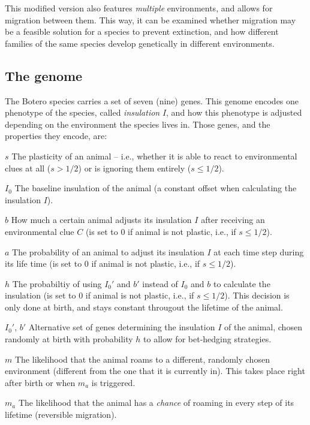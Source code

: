 \documentclass[
12pt, %
a4paper, %
headinclude,footinclude %
]{article}
\newcommand{\modfont}[1]{\begingroup\color{red}#1\endgroup}
\begin{document}
\modfont{This modified version also features \emph{multiple} environments, and allows for migration between them. This way, it can be examined whether migration may be a feasible solution for a species to prevent extinction, and how different families of the same species develop genetically in different environments.}

\subsection{The genome}
The Botero species carries a set of seven (\modfont{nine}) genes. This genome encodes one phenotype of the species, called \emph{insulation} $I$, and how this phenotype is adjusted depending on the environment the species lives in. Those genes, and the properties they encode, are:

\begin{description}
\item{$s$} The plasticity of an animal -- i.e., whether it is able to react to environmental clues at all ($s > 1/2$) or is ignoring them entirely ($s \leq 1/2$).
\item{$I_0$} The baseline insulation of the animal (a constant offset when calculating the insulation $I$).
\item{$b$} How much a certain animal adjusts its insulation $I$ after receiving an environmental clue $C$ (is set to $0$ if animal is not plastic, i.e., if $s \leq 1/2$).
\item{$a$} The probability of an animal to adjust its insulation $I$ at each time step during its life time (is set to $0$ if animal is not plastic, i.e., if $s \leq 1/2$).
\item{$h$} The probabiltiy of using $I_0'$ and $b'$ instead of $I_0$ and $b$ to calculate the insulation (is set to $0$ if animal is not plastic, i.e., if $s \leq 1/2$). This decision is only done at birth, and stays constant througout the lifetime of the animal.
\item{$I_0'$, $b'$} Alternative set of genes determining the insulation $I$ of the animal, chosen randomly at birth with probability $h$ to allow for bet-hedging strategies.
\item{\modfont{$m$}} \modfont{The likelihood that the animal roams to a different, randomly chosen environment (different from the one that it is currently in). This takes place right after birth or when $m_a$ is triggered.}
\item{\modfont{$m_a$}} \modfont{The likelihood that the animal has a \emph{chance} of roaming in every step of its lifetime (reversible migration).}
\end{description}
\end{document}
